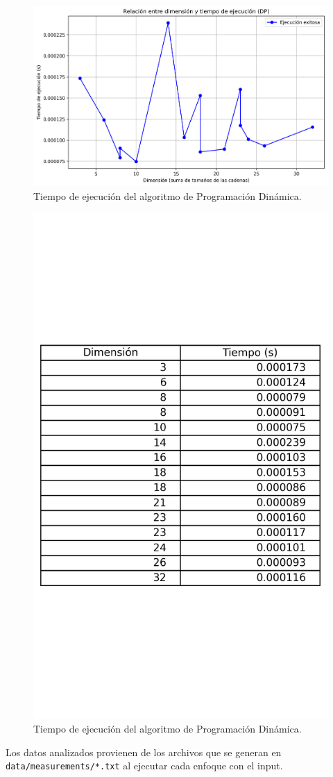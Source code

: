 \begin{figure}[h]
    \centering
    \includegraphics[width=0.7\linewidth]{report/images/dtdp.png}
    \caption{Tiempo de ejecución del algoritmo de Programación Dinámica.}
\end{figure}
\begin{figure}[h]
    \centering
    \includegraphics[width=0.7\linewidth]{report/images/dtdpt.png}
    \caption{Tiempo de ejecución del algoritmo de Programación Dinámica.}
\end{figure}

Los datos analizados provienen de los archivos que se generan en  \texttt{data/measurements/*.txt} al ejecutar cada enfoque con el input.

